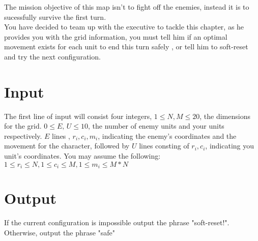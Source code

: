 \noindent The mission objective of this map isn't to fight off the enemies, instead it is to sucessfully survive the
first turn.\\

\noindent You have decided to team up with the executive to tackle this chapter, as he provides you with the grid
information, you must tell him if an optimal movement exists for each unit to end this turn safely , or tell him to
soft-reset and try the next configuration. \\

\section*{Input}
The first line of input will consist four integers, $1 \leq N, M \leq 20$, the dimensions for the grid.
$0 \leq E ,\, U \leq 10$, the number of enemy units and your units respectively. $E$ lines , $r_i, c_i, m_i$, indicating
the enemy's coordinates and the movement for the character, followed by $U$ lines consting of $r_i, c_i$, indicating
 you unit's coordinates. You may assume the following: $1 \leq r_i \leq N, 1 \leq c_i \leq M, 1 \leq m_i \leq M*N$ \\

\section*{Output}
If the current configuration is impossible output the phrase "soft-reset!". Otherwise, output the phrase "safe"

